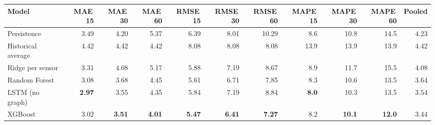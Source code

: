 \begin{tabular}{@{}lrrrrrrrrrr@{}}
\toprule
Model & MAE\,15 & MAE\,30 & MAE\,60 & RMSE\,15 & RMSE\,30 & RMSE\,60 & MAPE\,15 & MAPE\,30 & MAPE\,60 & Pooled \\
\midrule
Persistence & 3.49 & 4.20 & 5.37 & 6.39 & 8.01 & 10.29 & 8.6 & 10.8 & 14.5 & 4.23 \\
Historical average & 4.42 & 4.42 & 4.42 & 8.08 & 8.08 & 8.08 & 13.9 & 13.9 & 13.9 & 4.42 \\
Ridge per sensor & 3.31 & 4.08 & 5.17 & 5.88 & 7.19 & 8.67 & 8.9 & 11.7 & 15.5 & 4.08 \\
Random Forest & 3.08 & 3.68 & 4.45 & 5.61 & 6.71 & 7.85 & 8.3 & 10.6 & 13.5 & 3.64 \\
LSTM (no graph) & \textbf{2.97} & 3.55 & 4.35 & 5.84 & 7.19 & 8.84 & \textbf{8.0} & 10.3 & 13.5 & 3.54 \\
XGBoost & 3.02 & \textbf{3.51} & \textbf{4.01} & \textbf{5.47} & \textbf{6.41} & \textbf{7.27} & 8.2 & \textbf{10.1} & \textbf{12.0} & 3.44 \\
\bottomrule
\end{tabular}
